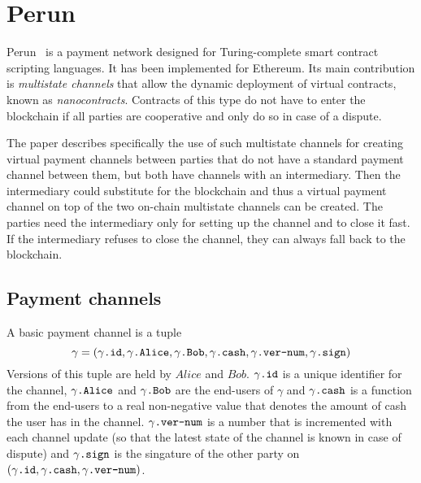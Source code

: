 \section{Perun}
  Perun~\cite{perun} is a payment network designed for Turing-complete smart contract
  scripting languages. It has been implemented for Ethereum. Its main contribution is
  \textit{multistate channels} that allow the dynamic deployment of virtual contracts,
  known as \textit{nanocontracts}. Contracts of this type do not have to enter the
  blockchain if all parties are cooperative and only do so in case of a dispute.

  The paper describes specifically the use of such multistate channels for creating
  virtual payment channels between parties that do not have a standard payment channel
  between them, but both have channels with an intermediary. Then the intermediary could
  substitute for the blockchain and thus a virtual payment channel on top of the two
  on-chain multistate channels can be created. The parties need the intermediary only for
  setting up the channel and to close it fast. If the intermediary refuses to close the
  channel, they can always fall back to the blockchain.

  \subsection{Payment channels}
    A basic payment channel is a tuple
    \begin{equation*}
      \gamma = \left(\gamma\mbox{\texttt{.id}}, \gamma\mbox{\texttt{.Alice}},
      \gamma\mbox{\texttt{.Bob}}, \gamma\mbox{\texttt{.cash}},
      \gamma\mbox{\texttt{.ver-num}}, \gamma\mbox{\texttt{.sign}}\right)
    \end{equation*}
    Versions of this tuple are held by $Alice$ and $Bob$. $\gamma\mbox{\texttt{.id}}$ is a
    unique identifier for the channel, $\gamma\mbox{\texttt{.Alice}}$ and
    $\gamma\mbox{\texttt{.Bob}}$ are the end-users of $\gamma$ and
    $\gamma\mbox{\texttt{.cash}}$ is a function from the end-users to a real non-negative
    value that denotes the amount of cash the user has in the channel.
    $\gamma\mbox{\texttt{.ver-num}}$ is a number that is incremented with each channel
    update (so that the latest state of the channel is known in case of dispute) and
    $\gamma\mbox{\texttt{.sign}}$ is the singature of the other party on
    $\left(\gamma\mbox{\texttt{.id}}, \gamma\mbox{\texttt{.cash}},
    \gamma\mbox{\texttt{.ver-num}}\right)$.


